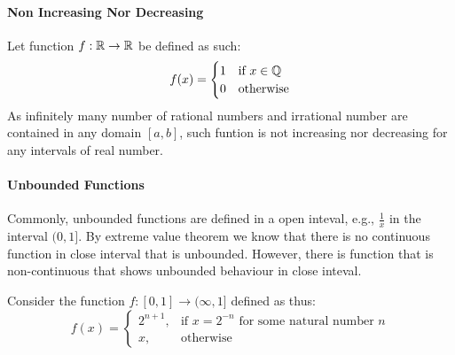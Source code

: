 \documentclass[../note.tex]{subfiles}
\begin{document}
\paragraph{Non Increasing Nor Decreasing}
Let function $f: \mathbb{R}\rightarrow \mathbb{R}$ be defined as such:
\[
	f(x)=
	\begin{cases}
		1 &\text{if } x \in \mathbb{Q}\\
		0 &\text{otherwise}
	\end{cases}
\]
As infinitely many number of rational numbers and irrational number are contained in any domain $[a,b]$, such funtion is not increasing nor decreasing for any intervals of real number.

\paragraph{Unbounded Functions}
Commonly, unbounded functions are defined in a open inteval, e.g., $\frac{1}{x}$ in the interval $(0, 1]$. By extreme value theorem we know that there is no continuous function in close interval that is unbounded. However, there is function that is non-continuous that shows unbounded behaviour in close inteval.

Consider the function $f:[0,1] \rightarrow (\infty, 1]$ defined as thus:
\[
    f(x)= 
\begin{cases}
	2^{n+1},& \text{if } x=2^{-n} \text{ for some natural number }n\\
    x,              & \text{otherwise}
\end{cases}
\]
\end{document}

